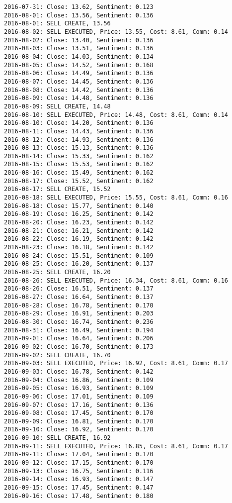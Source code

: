 \documentclass[11pt]{article}
\begin{document}
\begin{Verbatim}[commandchars=\\\{\}]
2016-07-31: Close: 13.62, Sentiment: 0.123
2016-08-01: Close: 13.56, Sentiment: 0.136
2016-08-01: SELL CREATE, 13.56
2016-08-02: SELL EXECUTED, Price: 13.55, Cost: 8.61, Comm: 0.14
2016-08-02: Close: 13.40, Sentiment: 0.136
2016-08-03: Close: 13.51, Sentiment: 0.136
2016-08-04: Close: 14.03, Sentiment: 0.134
2016-08-05: Close: 14.52, Sentiment: 0.168
2016-08-06: Close: 14.49, Sentiment: 0.136
2016-08-07: Close: 14.45, Sentiment: 0.136
2016-08-08: Close: 14.42, Sentiment: 0.136
2016-08-09: Close: 14.48, Sentiment: 0.136
2016-08-09: SELL CREATE, 14.48
2016-08-10: SELL EXECUTED, Price: 14.48, Cost: 8.61, Comm: 0.14
2016-08-10: Close: 14.20, Sentiment: 0.136
2016-08-11: Close: 14.43, Sentiment: 0.136
2016-08-12: Close: 14.93, Sentiment: 0.136
2016-08-13: Close: 15.13, Sentiment: 0.136
2016-08-14: Close: 15.33, Sentiment: 0.162
2016-08-15: Close: 15.53, Sentiment: 0.162
2016-08-16: Close: 15.49, Sentiment: 0.162
2016-08-17: Close: 15.52, Sentiment: 0.162
2016-08-17: SELL CREATE, 15.52
2016-08-18: SELL EXECUTED, Price: 15.55, Cost: 8.61, Comm: 0.16
2016-08-18: Close: 15.77, Sentiment: 0.140
2016-08-19: Close: 16.25, Sentiment: 0.142
2016-08-20: Close: 16.23, Sentiment: 0.142
2016-08-21: Close: 16.21, Sentiment: 0.142
2016-08-22: Close: 16.19, Sentiment: 0.142
2016-08-23: Close: 16.18, Sentiment: 0.142
2016-08-24: Close: 15.51, Sentiment: 0.109
2016-08-25: Close: 16.20, Sentiment: 0.137
2016-08-25: SELL CREATE, 16.20
2016-08-26: SELL EXECUTED, Price: 16.34, Cost: 8.61, Comm: 0.16
2016-08-26: Close: 16.51, Sentiment: 0.137
2016-08-27: Close: 16.64, Sentiment: 0.137
2016-08-28: Close: 16.78, Sentiment: 0.170
2016-08-29: Close: 16.91, Sentiment: 0.203
2016-08-30: Close: 16.74, Sentiment: 0.236
2016-08-31: Close: 16.49, Sentiment: 0.194
2016-09-01: Close: 16.64, Sentiment: 0.206
2016-09-02: Close: 16.70, Sentiment: 0.173
2016-09-02: SELL CREATE, 16.70
2016-09-03: SELL EXECUTED, Price: 16.92, Cost: 8.61, Comm: 0.17
2016-09-03: Close: 16.78, Sentiment: 0.142
2016-09-04: Close: 16.86, Sentiment: 0.109
2016-09-05: Close: 16.93, Sentiment: 0.109
2016-09-06: Close: 17.01, Sentiment: 0.109
2016-09-07: Close: 17.16, Sentiment: 0.136
2016-09-08: Close: 17.45, Sentiment: 0.170
2016-09-09: Close: 16.81, Sentiment: 0.170
2016-09-10: Close: 16.92, Sentiment: 0.170
2016-09-10: SELL CREATE, 16.92
2016-09-11: SELL EXECUTED, Price: 16.85, Cost: 8.61, Comm: 0.17
2016-09-11: Close: 17.04, Sentiment: 0.170
2016-09-12: Close: 17.15, Sentiment: 0.170
2016-09-13: Close: 16.75, Sentiment: 0.116
2016-09-14: Close: 16.93, Sentiment: 0.147
2016-09-15: Close: 17.45, Sentiment: 0.147
2016-09-16: Close: 17.48, Sentiment: 0.180

\end{Verbatim}
\end{document}
